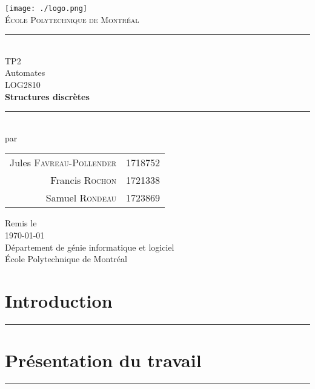 \documentclass[10pt,letterpaper]{article}
\begin{document}
\begin{titlepage}
\begin{center}

\texttt{[image: ./logo.png]}~\\[1cm]

\textsc{\huge École Polytechnique de Montréal}\\[1.5cm]

\rule{0.5\linewidth}{0.5mm} \\[0.4cm]
{\LARGE TP2}\\[0.4cm]
{\Large Automates}\\[1.0cm]

{\large LOG2810}\\[0.4cm]
{\large \textbf{Structures discrètes}}\\[0.4cm]

\rule{0.5\linewidth}{0.5mm} \\[1.0cm]

{\large par}\\[0.6cm]
\begin{Large}
  \begin{tabular}{r l}
    Jules \textsc{Favreau-Pollender} & 1718752\\[0.4cm]
    Francis \textsc{Rochon} & 1721338\\[0.4cm]
    Samuel \textsc{Rondeau} & 1723869\\[0.4cm]
  \end{tabular}
\end{Large}


\vfill

{\large Remis le}\\[0.3cm]
{\Large \today}\\[1.5cm]
{\large Département de génie informatique et logiciel}\\[0.3cm]
{\large École Polytechnique de Montréal}

\end{center}
\end{titlepage}



\section{Introduction}
\hrule
\vspace{1em}



\newpage
\section{Présentation du travail}
\hrule
\vspace{1em}
\end{document}

